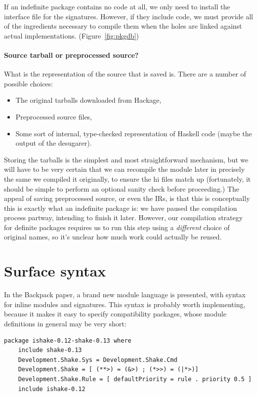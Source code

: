 \documentclass{article}
\begin{document}
If an indefinite package contains no code at all, we only need
to install the interface file for the signatures.  However, if
they include code, we must provide all of the
ingredients necessary to compile them when the holes are linked against
actual implementations.  (Figure~\ref{fig:pkgdb})

\paragraph{Source tarball or preprocessed source?}  What is the representation of the source that is saved is.  There
are a number of possible choices:

\begin{itemize}
    \item The original tarballs downloaded from Hackage,
    \item Preprocessed source files,
    \item Some sort of internal, type-checked representation of Haskell code (maybe the output of the desugarer).
\end{itemize}

Storing the tarballs is the simplest and most straightforward mechanism,
but we will have to be very certain that we can recompile the module
later in precisely the same we compiled it originally, to ensure the hi
files match up (fortunately, it should be simple to perform an optional
sanity check before proceeding.) The appeal of saving preprocessed
source, or even the IRs, is that this is conceptually this is exactly
what an indefinite package is: we have paused the compilation process
partway, intending to finish it later.  However, our compilation strategy
for definite packages requires us to run this step using a \emph{different}
choice of original names, so it's unclear how much work could actually be reused.

\section{Surface syntax}

In the Backpack paper, a brand new module language is presented, with
syntax for inline modules and signatures.  This syntax is probably worth implementing,
because it makes it easy to specify compatibility packages, whose module
definitions in general may be very short:

\begin{verbatim}
package ishake-0.12-shake-0.13 where
    include shake-0.13
    Development.Shake.Sys = Development.Shake.Cmd
    Development.Shake = [ (**>) = (&>) ; (*>>) = (|*>)]
    Development.Shake.Rule = [ defaultPriority = rule . priority 0.5 ]
    include ishake-0.12
\end{verbatim}
\end{document}
